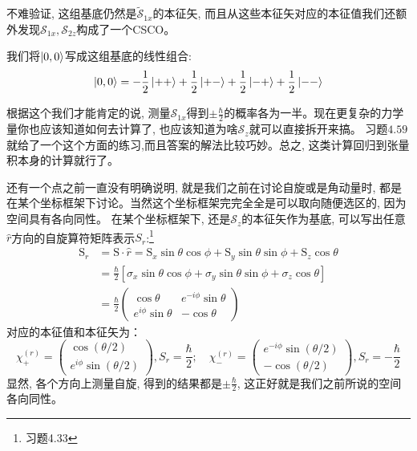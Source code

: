 \documentclass[a4paper,zihao=-4,linespread=1]{ctexrep}
\begin{document}
    不难验证, 这组基底仍然是$\tilde{\mathcal{S}}_{1x}$的本征矢, 而且从这些本征矢对应的本征值我们还额外发现$\mathcal{S}_{1x},\mathcal{S}_{2z}$构成了一个CSCO。

    我们将$\ket{0,0}$写成这组基底的线性组合:
    \[\ket{0,0}=-\frac{1}{2}\ket{++}+\frac{1}{2}\ket{+-}+\frac{1}{2}\ket{-+}+\frac{1}{2}\ket{--}\]
    
    根据这个我们才能肯定的说, 测量$\mathcal{S}_{1x}$得到$\pm\frac{\hbar}{2}$的概率各为一半。现在更复杂的力学量你也应该知道如何去计算了, 也应该知道为啥$\mathcal{S}_z$就可以直接拆开来搞。
    习题$4.59$就给了一个这个方面的练习,而且答案的解法比较巧妙。总之, 这类计算回归到张量积本身的计算就行了。

    还有一个点之前一直没有明确说明, 就是我们之前在讨论自旋或是角动量时, 都是在某个坐标框架下讨论。当然这个坐标框架完完全全是可以取向随便选区的, 因为空间具有各向同性。
    在某个坐标框架下, 还是$\mathcal{S}_z$的本征矢作为基底, 可以写出任意$\hat{r}$方向的自旋算符矩阵表示$S_r$:\footnote{习题4.33}
    \begin{equation}
        \begin{aligned}
            \mathrm{S}_{r} &=\mathrm{S} \cdot \hat{r}=\mathrm{S}_{x} \sin \theta \cos \phi+\mathrm{S}_{y} \sin \theta \sin \phi+\mathrm{S}_{z} \cos \theta \\
            &=\frac{\hbar}{2}\left[\sigma_{x} \sin \theta \cos \phi+\sigma_{y} \sin \theta \sin \phi+\sigma_{z} \cos \theta\right]
            \\ &=\boxed{\frac{\hbar }{2} \begin{pmatrix}
            \cos\theta &e^{-i\phi}\sin\theta \\
            e^{i\phi}\sin\theta &-\cos\theta 
            \end{pmatrix}}
        \end{aligned}
    \end{equation}
    对应的本征值和本征矢为：
    \begin{equation}
        \label{eq:4.117}
        \chi_{+}^{(r)}=\begin{pmatrix}
        \cos (\theta / 2) \\
        e^{i \phi} \sin (\theta / 2)
        \end{pmatrix},S_r=\frac{\hbar}{2} ; \quad \chi_{-}^{(r)}=\begin{pmatrix}
        e^{-i \phi} \sin (\theta / 2) \\
        -\cos (\theta / 2)
        \end{pmatrix},S_r=-\frac{\hbar}{2} 
    \end{equation}
    显然, 各个方向上测量自旋, 得到的结果都是$\pm\frac{\hbar}{2}$, 这正好就是我们之前所说的空间各向同性。
    
\end{document}
